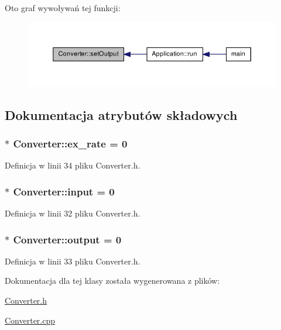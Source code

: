 \-Oto graf wywoływań tej funkcji\-:\nopagebreak
\begin{figure}[H]
\begin{center}
\leavevmode
\includegraphics[width=350pt]{class_converter_aa74b89ae3f4652130726fb64ce970020_icgraph}
\end{center}
\end{figure}




\subsection{\-Dokumentacja atrybutów składowych}
\hypertarget{class_converter_a84a5722a12516505b73cf900938138ff}{
\subsubsection[{ex\-\_\-rate}]{ $\ast$ {\bf \-Converter\-::ex\-\_\-rate} = 0}}\label{class_converter_a84a5722a12516505b73cf900938138ff}


\-Definicja w linii 34 pliku \-Converter.\-h.

\hypertarget{class_converter_a5bea25c79f8853dd57505af05af0b42a}{
\subsubsection[{input}]{ $\ast$ {\bf \-Converter\-::input} = 0}}\label{class_converter_a5bea25c79f8853dd57505af05af0b42a}


\-Definicja w linii 32 pliku \-Converter.\-h.

\hypertarget{class_converter_a5f69c39d5bf6a2f969720b04d8dfe0c3}{
\subsubsection[{output}]{ $\ast$ {\bf \-Converter\-::output} = 0}}\label{class_converter_a5f69c39d5bf6a2f969720b04d8dfe0c3}


\-Definicja w linii 33 pliku \-Converter.\-h.



\-Dokumentacja dla tej klasy została wygenerowana z plików\-:\begin{DoxyCompactItemize}
\item 
\hyperlink{_converter_8h}{\-Converter.\-h}\item 
\hyperlink{_converter_8cpp}{\-Converter.\-cpp}\end{DoxyCompactItemize}
